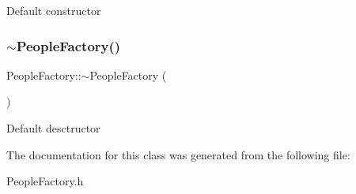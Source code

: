 Default constructor \mbox{\label{classPeopleFactory_a18d1aec526ba93ca84cde1c25cfb8944}} 
\subsubsection{\texorpdfstring{$\sim$\+People\+Factory()}{~PeopleFactory()}}
{\footnotesize\ttfamily People\+Factory\+::$\sim$\+People\+Factory (\begin{DoxyParamCaption}{ }\end{DoxyParamCaption})}

Default desctructor 

The documentation for this class was generated from the following file\+:\begin{DoxyCompactItemize}
\item 
People\+Factory.\+h\end{DoxyCompactItemize}
